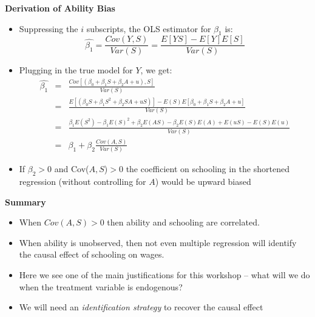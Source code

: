 \documentclass[notes=show]{beamer}
\begin{document}
\begin{frame}[shrink=20,plain]

	\begin{center}
	\textbf{Derivation of Ability Bias}
	\end{center}
	
	\begin{itemize}
	\item Suppressing the $i$ subscripts, the OLS estimator for $\beta_1$ is:$$\widehat{\beta_1} = \frac{Cov(Y,S)}{Var(S)} = \frac{E[YS] - E[Y]E[S]}{Var(S)}$$
	\item Plugging in the true model for $Y$, we get:
		\begin{eqnarray*}
		\widehat{\beta_1} &=& \frac{Cov[(\beta_0 + \beta_1{S} + \beta_2{A} + u),S]}{Var(S)} \\
		&=& \frac{E[(\beta_0{S} + \beta_1S^2 + \beta_2{S}{A} + u{S})] - E(S)E[\beta_0 + \beta_1{S} + \beta_2A + u]}{Var(S)} \\
		&=& \frac{\beta_1 E(S^2) - \beta_1 E(S)^2 + \beta_2 E(AS) - \beta_2 E(S)E(A) + E(u S) - E(S)E(u)}{Var(S)} \\
		&=& \beta_1 + \beta_2 \frac{Cov(A,S)}{Var(S)}
		\end{eqnarray*}
	\item If $\beta_2>0$ and Cov($A,S$)$>0$ the coefficient on schooling in the shortened regression (without controlling for $A$) would be upward biased
	\end{itemize}
\end{frame}


\begin{frame}[plain]

\begin{center}
\textbf{Summary}
\end{center}

\begin{itemize}
\item When $Cov(A,S)>0$ then ability and schooling are correlated.  
\item When ability is unobserved, then not even multiple regression will identify the causal effect of schooling on wages.
\item Here we see one of the main justifications for this workshop -- what will we do when the treatment variable is endogenous?
\item We will need an \emph{identification strategy} to recover the causal effect
\end{itemize}

\end{frame}
\end{document}
